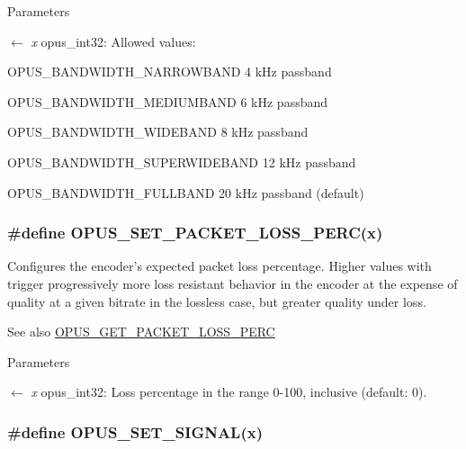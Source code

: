 \begin{DoxyParams}{Parameters}
\item[\mbox{$\leftarrow$} {\em x}]{\ttfamily opus\_\-int32}: Allowed values: 
\begin{DoxyDescription}
\item[OPUS\_\-BANDWIDTH\_\-NARROWBAND ]4 kHz passband 
\item[OPUS\_\-BANDWIDTH\_\-MEDIUMBAND ]6 kHz passband 
\item[OPUS\_\-BANDWIDTH\_\-WIDEBAND ]8 kHz passband 
\item[OPUS\_\-BANDWIDTH\_\-SUPERWIDEBAND]12 kHz passband 
\item[OPUS\_\-BANDWIDTH\_\-FULLBAND ]20 kHz passband (default) 
\end{DoxyDescription}\end{DoxyParams}
\hypertarget{group__opus__encoderctls_gafda1c951dea919ba54432cd03827f1a9}{
\subsubsection[{OPUS\_\-SET\_\-PACKET\_\-LOSS\_\-PERC}]{\setlength{\rightskip}{0pt plus 5cm}\#define OPUS\_\-SET\_\-PACKET\_\-LOSS\_\-PERC(x)}}
\label{group__opus__encoderctls_gafda1c951dea919ba54432cd03827f1a9}


Configures the encoder's expected packet loss percentage. Higher values with trigger progressively more loss resistant behavior in the encoder at the expense of quality at a given bitrate in the lossless case, but greater quality under loss. \begin{DoxySeeAlso}{See also}
\hyperlink{group__opus__encoderctls_gaa79261c6a55444993fca8d3a3a29d519}{OPUS\_\-GET\_\-PACKET\_\-LOSS\_\-PERC} 
\end{DoxySeeAlso}

\begin{DoxyParams}{Parameters}
\item[\mbox{$\leftarrow$} {\em x}]{\ttfamily opus\_\-int32}: Loss percentage in the range 0-\/100, inclusive (default: 0). \end{DoxyParams}
\hypertarget{group__opus__encoderctls_gaaa87ccee4ae46aa6c9528e03c5122b89}{
\subsubsection[{OPUS\_\-SET\_\-SIGNAL}]{\setlength{\rightskip}{0pt plus 5cm}\#define OPUS\_\-SET\_\-SIGNAL(x)}}
\label{group__opus__encoderctls_gaaa87ccee4ae46aa6c9528e03c5122b89}


